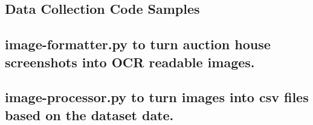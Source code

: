 \documentclass[journal]{IEEEtran}
\begin{document}
\begin{appendices}
    \section{Data Collection Code Samples}
    \label{appendix:collection-code}
    \subsection{image-formatter.py to turn auction house screenshots into OCR readable images.}
    \label{algorithm:image-formatter}
    
    \subsection{image-processor.py to turn images into csv files based on the dataset date.}
    \label{algorithm:image-processor}
    
\end{appendices}
\end{document}
